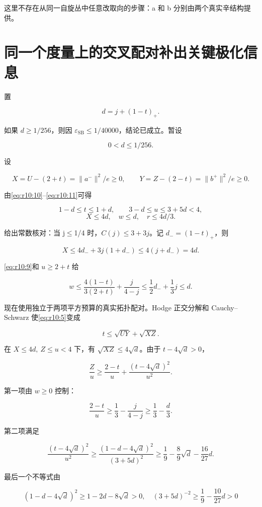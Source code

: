 \documentclass[UTF8,11pt,openany,oneside,fontset=none]{ctexbook}
\begin{document}
这里不存在从同一自旋丛中任意改取向的步骤：a 和 b 分别由两个真实辛结构提供。

\section{同一个度量上的交叉配对补出关键极化信息}\label{ch10:ux540cux4e00ux4e2aux5ea6ux91cfux4e0aux7684ux4ea4ux53c9ux914dux5bf9ux8865ux51faux5173ux952eux6781ux5316ux4fe1ux606f}

置

\[
d=j+(1-t)_+.
\]

如果 \(d\ge1/256\)，则因 \(\varepsilon_{\mathrm{SB}}\le1/40000\)，结论已成立。暂设

\[
0<d\le1/256.
\tag{10.13}\label{eq:r10:13}
\]

设

\[
X=U-(2+t)=\|a^-\|^2/e\ge0,
\qquad Y=Z-(2-t)=\|b^+\|^2/e\ge0.
\]

由\eqref{eq:r10:10}--\eqref{eq:r10:11}可得

\[
1-d\le t\le1+d,\qquad 3-d\le u\le3+5d<4,
\] \[
\boxed{X\le4d,\quad w\le d,\quad r\le4d/3.}
\tag{10.14}\label{eq:r10:14}
\]

给出常数核对：当 j\(\le\)1/4 时，\(C(j)\le3+3j\)。记 \(d_-=(1-t)_+\)，则

\[
X\le4d_-+3j(1+d_-)\le4(j+d_-)=4d.
\]

\eqref{eq:r10:9}和 \(u\ge2+t\) 给

\[
w\le\frac{4(1-t)}{3(2+t)}+\frac{j}{4-j}
\le\frac12d_-+\frac13j\le d.
\]

现在使用独立于两项平方预算的真实拓扑配对。Hodge 正交分解和 Cauchy--Schwarz 使\eqref{eq:r10:5}变成

\[
\boxed{t\le\sqrt{UY}+\sqrt{XZ}.}
\tag{10.15}\label{eq:r10:15}
\]

在 \(X\le4d,\ Z\le u<4\) 下，有 \(\sqrt{XZ}\le4\sqrt d\)。由于 \(t-4\sqrt d>0\)，

\[
\frac Zu\ge\frac{2-t}{u}
+\frac{(t-4\sqrt d)^2}{u^2}.
\tag{10.16}\label{eq:r10:16}
\]

第一项由 \(w\ge0\) 控制：

\[
\frac{2-t}{u}\ge\frac13-\frac j{4-j}\ge\frac13-\frac d3.
\]

第二项满足

\[
\frac{(t-4\sqrt d)^2}{u^2}
\ge\frac{(1-d-4\sqrt d)^2}{(3+5d)^2}
\ge\frac19-\frac89\sqrt d-\frac{16}{27}d.
\]

最后一个不等式由

\[
(1-d-4\sqrt d)^2\ge1-2d-8\sqrt d>0,
\quad
(3+5d)^{-2}\ge\frac19-\frac{10}{27}d>0
\]
\end{document}
